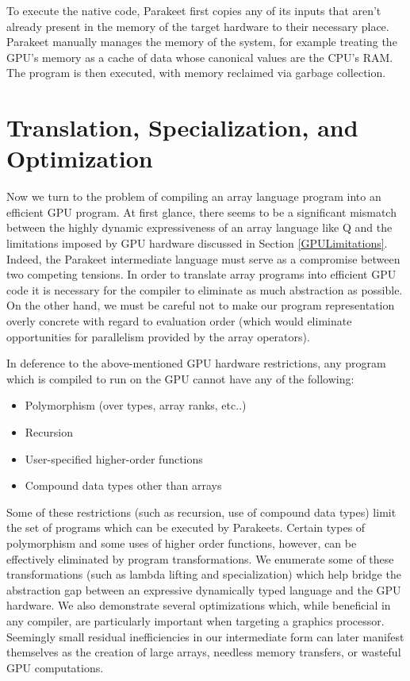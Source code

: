 \documentclass[10pt,twocolumn]{article}
\begin{document}
To execute the native code, Parakeet first copies any of its inputs that aren't already present in the memory of the target hardware to their necessary place.  Parakeet manually manages the memory of the system, for example treating the GPU's memory as a cache of data whose canonical values are the CPU's RAM. The program is then executed, with memory reclaimed via garbage collection.

\section{Translation, Specialization, and Optimization}
\label{Compilation}
Now we turn to the problem of compiling an array language program into an efficient GPU program. At first glance, there seems to be a significant mismatch between the highly dynamic expressiveness of an array language like Q and the limitations imposed by GPU hardware discussed in Section \ref{GPULimitations}. Indeed, the Parakeet intermediate language must serve as a compromise between two competing tensions. In order to translate array programs into efficient GPU code it is necessary for the compiler to eliminate as much abstraction as possible. On the other hand, we must be careful not to make our program representation overly concrete with regard to evaluation order (which would eliminate opportunities for parallelism provided by the array operators). 

In deference to the above-mentioned GPU hardware restrictions, any program which is compiled to run on the GPU cannot have any of the following:

\begin{itemize}
\item Polymorphism (over types, array ranks, etc..) 
\item Recursion
\item User-specified higher-order functions
\item Compound data types other than arrays
\end{itemize}

Some of these restrictions (such as recursion, use of compound data types) limit the set of programs which can be executed by Parakeets. Certain types of polymorphism and some uses of higher order functions, however, can be effectively eliminated by program transformations. We enumerate some of these transformations (such as lambda lifting and specialization) which help bridge the abstraction gap between an expressive dynamically typed language and the GPU hardware. We also demonstrate several optimizations which, while beneficial in any compiler, are particularly important when targeting a graphics processor. Seemingly small residual inefficiencies in our intermediate form can later manifest themselves as the creation of large arrays, needless memory transfers, or wasteful GPU computations.
\end{document}
